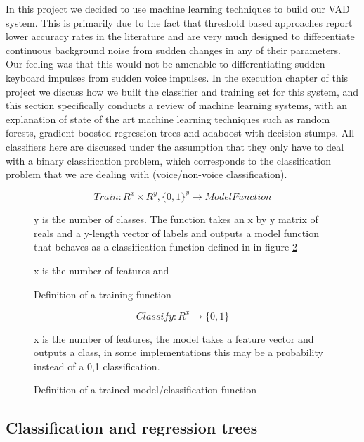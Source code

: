 \documentclass[ %
                    author={Sam Phippen},
                supervisor={Dr. Rafal Bogacz},
                     title={Real time voice activity detectors in noisy personal computing environments},
                  subtitle={},
                    degree={MEng},
                      year={2012} ]{thesis}
\begin{document}
In this project we decided to use machine learning techniques to build our VAD
system. This is primarily due to the fact that threshold based approaches
report lower accuracy rates in the literature and are very much designed to
differentiate continuous background noise from sudden changes in any of their
parameters. Our feeling was that this would not be amenable to differentiating
sudden keyboard impulses from sudden voice impulses. In the execution chapter
of this project we discuss how we built the classifier and training set for
this system, and this section specifically conducts a review of machine
learning systems, with an explanation of state of the art machine learning
techniques such as random forests, gradient boosted regression trees and
adaboost with decision stumps. All classifiers here are discussed under the
assumption that they only have to deal with a binary classification problem,
which corresponds to the classification problem that we are dealing with
(voice/non-voice classification).

\begin{figure}
    $$Train:R^x \times R^y, \{0,1\}^y \rightarrow ModelFunction$$

    y is the number of classes. The function takes an x by y matrix of reals
    and a y-length vector of labels and outputs a model function that behaves
    as a classification function defined in in figure \ref{eqn:define-classify}

    \caption{Definition of a training function} x is the number of features and

    \label{eqn:define-train}
\end{figure}

\begin{figure}
    $$Classify: R^x \rightarrow \{0,1\}$$

    x is the number of features, the model takes a feature vector and outputs a
    class, in some implementations this may be a probability instead of a {0,1}
    classification.

    \caption{Definition of a trained model/classification function}

    \label{eqn:define-classify}
\end{figure}

\subsection{Classification and regression trees}
\end{document}
